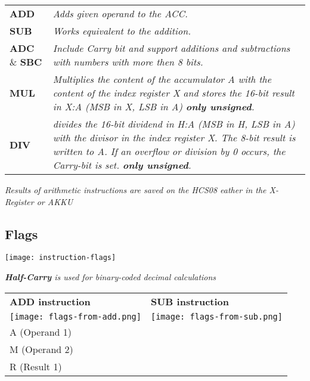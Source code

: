 \begin{tabular}{lp{}}
    \textbf{ADD} & \textit{Adds given operand to the ACC.} \\
    \textbf{SUB} & \textit{Works equivalent to the addition.} \\
    \textbf{ADC} \& \textbf{SBC}
                & \textit{
                    Include Carry bit and support additions and subtractions
                    with numbers with more then 8 bits.
                } \\
    \textbf{MUL}
                & \textit{
                    Multiplies the content of the accumulator A with the content
                    of the index register X and stores the 16-bit result in X:A
                    (MSB in X, LSB in A)
                    \newline
                    \textbf{only unsigned}.
                } \\
    \textbf{DIV}
                & \textit{
                    divides the 16-bit dividend in H:A (MSB in H, LSB in A) with
                    the divisor in the index register X. The 8-bit result is written
                    to A. If an overflow or division by 0 occurs, the Carry-bit is set.
                    \newline
                    \textbf{only unsigned}.
                } \\
\end{tabular}

\textit{
    Results of arithmetic instructions are saved on the HCS08
    eather in the X-Register or AKKU
}

\subsection{Flags}

\texttt{[image: instruction-flags]}

\textit{\textbf{Half-Carry} is used for binary-coded decimal calculations}
\\
\begin{tabular}{ll}
    \textbf{ADD instruction} & \textbf{SUB instruction} \\
    \texttt{[image: flags-from-add.png]} &
    \texttt{[image: flags-from-sub.png]} \\
    A (Operand 1) \\
    M (Operand 2) \\
    R (Result 1) \\
\end{tabular}

